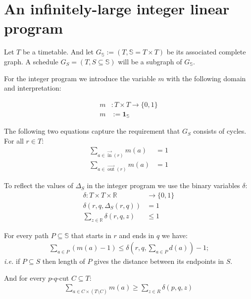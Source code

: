 \documentclass{amsart} %
\def\ie{\emph{i.e.}}
\DeclareMathOperator{\In}{in}
\DeclareMathOperator{\Out}{out}
\newcommand{\ina}{\ensuremath{\vec{\In}}}
\newcommand{\outa}{\ensuremath{\vec{\Out}}}
\begin{document}
\section{An infinitely-large integer linear program}

Let \(T\) be a timetable.  And let \(G_\mathbb{S} := (T, \mathbb{S} =
T \times T) \) be its associated complete graph.  A schedule \(G_S = (T, S \subseteq \mathbb{S})\)
will be a subgraph of \(G_\mathbb{S}\).


For the integer program we introduce the variable \(m\) with the following domain and interpretation:

\begin{align}
  m & \colon T \times T \to \{0,1\} \\
  m & := \mathbf{1}_{\mathbb{S}}
\end{align}


The following two equations capture the requirement that \(G_S\) consists of cycles.  For all \(r \in T\):
\begin{align}
  \sum_{a \in \ina(r)}  m(a) &= 1\\
  \sum_{a \in \outa(r)} m(a) &= 1
\end{align}

To reflect the values of \(\Delta_S\) in the integer program we use the binary variables \(\delta\):
\begin{align}
  \delta \colon T \times T \times \mathbb{R} & \to \{0,1\} \\
  \delta\left(r, q, \Delta_S\left(r,q\right)\right) &= 1 \\
  \sum_{z \in \mathbb{R}} \delta(r, q, z) &\leq 1
\end{align}

For every path \(P \subseteq \mathbb{S}\) that starts in \(r\) and ends in \(q\) we have:
\begin{align}
\sum_{a \in P} (m(a) - 1) \leq \delta \left(r,q, \sum_{a \in P} d \left(a\right)\right) - 1 \textrm{;}
\end{align}
\ie{} if \(P \subseteq S\) then length of \(P\) gives
the distance between its endpoints in \(S\).

And for every \(p\)-\(q\)-cut \(C \subseteq T\):
\begin{align}
  \sum_{a \in C \times (T \setminus C)} m(a) \geq \sum_{z \in R} \delta (p,q, z)
\end{align}
\end{document}
